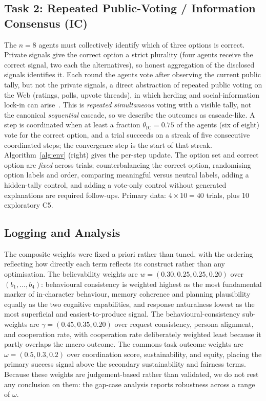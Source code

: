 \documentclass[runningheads]{llncs}
\begin{document}
\subsection{Task 2: Repeated Public-Voting / Information Consensus (IC)}
The $n=8$ agents must collectively identify which of three options is correct. Private signals
give the correct option a strict plurality (four agents receive the correct signal, two each the
alternatives), so honest aggregation of the disclosed signals identifies it. Each round the agents
vote after observing the current public tally, but not the private signals, a direct abstraction of
repeated public voting on the Web (ratings, polls, upvote threads), in which herding and
social-information lock-in can arise~\cite{bikhchandani1992theory}. This is \emph{repeated
simultaneous} voting with a visible tally, not the canonical \emph{sequential} cascade, so we
describe the outcomes as cascade-like. A step is coordinated when at least a fraction
$\theta_{\mathrm{IC}}=0.75$ of the agents (six of eight) vote for the correct option, and a trial
succeeds on a streak of five consecutive coordinated steps; the convergence step is the start of
that streak. Algorithm~\ref{alg:env} (right) gives the per-step update. The option set and correct
option are \emph{fixed} across trials; counterbalancing the correct option, randomising option
labels and order, comparing meaningful versus neutral labels, adding a hidden-tally control, and
adding a vote-only control without generated explanations are required follow-ups. Primary data:
$4 \times 10 = 40$ trials, plus 10 exploratory C5.


\subsection{Logging and Analysis}
The composite weights were fixed a priori rather than tuned, with the ordering reflecting how
directly each term reflects its construct rather than any optimisation. The believability weights
are $w=(0.30,0.25,0.25,0.20)$ over $(b_1,\dots,b_4)$: behavioural consistency is weighted highest
as the most fundamental marker of in-character behaviour, memory coherence and planning
plausibility equally as the two cognitive capabilities, and response naturalness lowest as the
most superficial and easiest-to-produce signal. The behavioural-consistency sub-weights are
$\gamma=(0.45,0.35,0.20)$ over request consistency, persona alignment, and cooperation rate, with
cooperation rate deliberately weighted least because it partly overlaps the macro outcome. The
commons-task outcome weights are $\omega=(0.5,0.3,0.2)$ over coordination score, sustainability,
and equity, placing the primary success signal above the secondary sustainability and fairness
terms. Because these weights are judgement-based rather than validated, we do not rest any
conclusion on them: the gap-case analysis reports robustness across a range of $\omega$.
\end{document}
